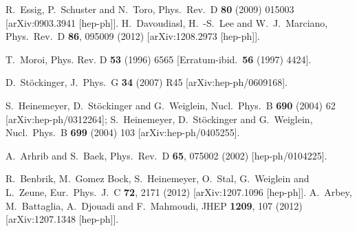\begin{thebibliography}{99}
  R.~Essig, P.~Schuster and N.~Toro,
  Phys.\ Rev.\  D {\bf 80} (2009) 015003
  [arXiv:0903.3941 [hep-ph]].
  H.~Davoudiasl, H.~-S.~Lee and W.~J.~Marciano,
  Phys.\ Rev.\ D {\bf 86}, 095009 (2012)
  [arXiv:1208.2973 [hep-ph]].


T.~Moroi,  
                     {Phys. Rev. D} {\bf  53} (1996) 6565
                     [Erratum-ibid.\ {\bf 56} (1997) 4424].


 D.~St\"ockinger, 
J.\ Phys.\ G {\bf 34} (2007) R45
 [arXiv:hep-ph/0609168].  

  S.~Heinemeyer, D.~St\"ockinger and G.~Weiglein,
  Nucl.\ Phys.\ B {\bf 690} (2004) 62
  [arXiv:hep-ph/0312264];
  S.~Heinemeyer, D.~St\"ockinger and G.~Weiglein,
  Nucl.\ Phys.\ B {\bf 699} (2004) 103
  [arXiv:hep-ph/0405255].

  A.~Arhrib and S.~Baek,
  Phys.\ Rev.\ D {\bf 65}, 075002 (2002)
  [hep-ph/0104225].




  R.~Benbrik, M.~Gomez Bock, S.~Heinemeyer, O.~Stal, G.~Weiglein and L.~Zeune,
  Eur.\ Phys.\ J.\ C {\bf 72}, 2171 (2012)
  [arXiv:1207.1096 [hep-ph]].
  A.~Arbey, M.~Battaglia, A.~Djouadi and F.~Mahmoudi,
  JHEP {\bf 1209}, 107 (2012)
  [arXiv:1207.1348 [hep-ph]].


\end{thebibliography}
